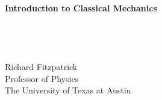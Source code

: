 \documentclass[12pt]{article}
\begin{document}
\thispagestyle{empty}
\begin{center}
{\Huge\bf Introduction to Classical Mechanics}\\[1ex]
~\\
~\\
~\\
~\\
{\Large \sf Richard Fitzpatrick}\\[1.5ex]
{\Large\sf  Professor  of Physics}\\[1.5ex]
{\Large\sf  The University of Texas at Austin}
\end{center}
\tableofcontents
\pagestyle{fancy}
\cfoot{\thepage}

\large{













}
\end{document}
